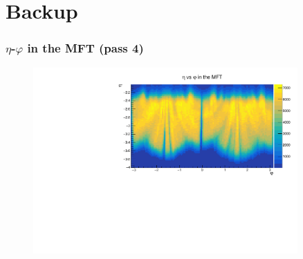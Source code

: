 \documentclass[10pt]{beamer}
\begin{document}
\section{Backup}

\begin{frame}
    \frametitle{$\eta$-$\varphi$ in the MFT (pass 4)}
        \begin{figure}
            \begin{center}
                \includegraphics[width=0.9\textwidth]{Plots/pass4_MFT/eta_phi_pass4.pdf}
            \end{center}
        \end{figure}
\end{frame}
\end{document}
